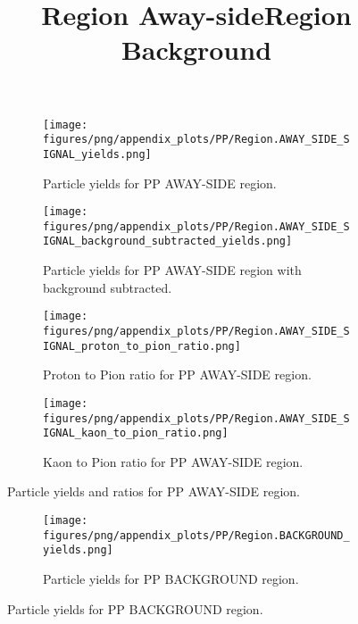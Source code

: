                 \begin{figure}[H]
                    \title{Region Away-side}
                    \begin{subfigure}[b]{0.5\textwidth}
                        \centering
                        \texttt{[image: figures/png/appendix\_plots/PP/Region.AWAY\_SIDE\_SIGNAL\_yields.png]}
                        \caption{Particle yields for PP AWAY-SIDE region.}
                        \label{fig:appendix_PP_AWAY_SIDE_SIGNAL_Inclusive_Yields}
                    \end{subfigure}
                    \begin{subfigure}[b]{0.5\textwidth}
                        \centering
                        \texttt{[image: figures/png/appendix\_plots/PP/Region.AWAY\_SIDE\_SIGNAL\_background\_subtracted\_yields.png]}
                        \caption{Particle yields for PP AWAY-SIDE region with background subtracted.}
                        \label{fig:appendix_PP_AWAY_SIDE_SIGNAL_Inclusive_Yields_Background_Subtracted}
                    \end{subfigure}
                    \begin{subfigure}[b]{0.5\textwidth}
                        \centering
                        \texttt{[image: figures/png/appendix\_plots/PP/Region.AWAY\_SIDE\_SIGNAL\_proton\_to\_pion\_ratio.png]}
                        \caption{Proton to Pion ratio for PP AWAY-SIDE region.}
                        \label{fig:appendix_PP_AWAY_SIDE_SIGNAL_Proton_to_Pion_Ratio}
                    \end{subfigure}
                    \begin{subfigure}[b]{0.5\textwidth}
                        \centering
                        \texttt{[image: figures/png/appendix\_plots/PP/Region.AWAY\_SIDE\_SIGNAL\_kaon\_to\_pion\_ratio.png]}
                        \caption{Kaon to Pion ratio for PP AWAY-SIDE region.}
                        \label{fig:appendix_PP_AWAY_SIDE_SIGNAL_Kaon_to_Pion_Ratio}
                    \end{subfigure}
                    \caption{Particle yields and ratios for PP AWAY-SIDE region.}
                    \label{fig:appendix_PP_AWAY_SIDE_SIGNAL_Inclusive_Yields_and_Ratios}
                \end{figure}
                \begin{figure}[H]
                    \title{Region Background}
                    \begin{subfigure}[b]{0.5\textwidth}
                        \centering
                        \texttt{[image: figures/png/appendix\_plots/PP/Region.BACKGROUND\_yields.png]}
                        \caption{Particle yields for PP BACKGROUND region.}
                        \label{fig:appendix_PP_BACKGROUND_Inclusive_Yields}
                    \end{subfigure}
                    \caption{Particle yields for PP BACKGROUND region.}
                    \label{fig:appendix_PP_BACKGROUND_Inclusive_Yields}
                \end{figure}


